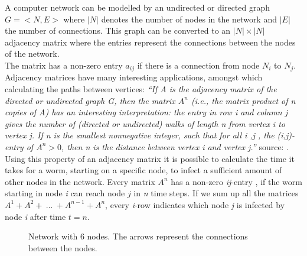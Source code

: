 A computer network can be modelled by an undirected or directed graph $G = < N, E> $ where $|N|$ denotes the number of nodes in the network and $|E|$ the number of connections. This graph can be converted to an  $|N| \times |N|$ adjacency matrix where the entries represent the connections between the nodes of the network. \\
The matrix has a non-zero entry $a_{ij}$ if there is a connection from node $N_{i}$ to $N_{j}$. \\ 


Adjacency matrices have many interesting applications, amongst which calculating the paths between vertices:
\textit{``If \textit{A} is the adjacency matrix of the directed or undirected graph \textit{G}, then the matrix $A^{n}$ (i.e., the matrix product of \textit{n} copies of \textit{A}) has an interesting interpretation: the entry in row \textit{i} and column \textit{j} gives the number of (directed or undirected) walks of length \textit{n} from vertex \textit{i} to vertex \textit{j}. If \textit{n} is the smallest nonnegative integer, such that for all i ,j , the (i,j)-entry of $A^{n} > 0$, then n is the distance between vertex i and vertex \textit{j}.''}  source: \cite{wikimatrix} .\\
Using this property of an adjacency matrix it is possible to calculate the time it takes for a worm, starting on a specific node, to infect a sufficient amount of other nodes in the network. Every matrix $A^{n}$ has a non-zero \textit{ij}-entry , if the worm starting in node \textit{i} can reach node $j$ in \textit{n} time steps. If we sum up all the matrices $A^{1} + A^{2} + ~...~+ A^{n-1}+A^{n}$, every \textit{i}-row indicates which node \textit{j} is infected by node \textit{i} after time $t=n$.  

\begin{figure}
\centering
{}
\caption{Network with 6 nodes. The arrows represent the connections between the nodes. }
\label{netwerkfiguur}
\end{figure}

